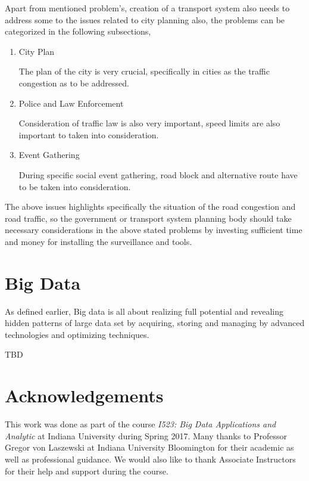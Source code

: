 \documentclass[sigconf]{acmart}
\begin{document}
Apart from mentioned problem's, creation of a transport system also needs to address some to the issues related to city planning also, the problems can be categorized in the following subsections,

\begin{enumerate}
\item City Plan 

The plan of the city is very crucial, specifically in cities as the traffic congestion as to be addressed. 

\item Police and Law Enforcement 

Consideration of traffic law is also very important, speed limits are also important to taken into consideration.

\item Event Gathering 

During specific social event gathering, road block and alternative route have to be taken into consideration.

\end{enumerate}

The above issues highlights specifically the situation of the road congestion and road traffic, so the government or transport system planning body should take necessary considerations in the above stated problems by investing sufficient time and money for installing the surveillance and tools. 


\section{Big Data}

As defined earlier, Big data is all about realizing full potential and revealing hidden patterns of large data set by acquiring, storing and managing by advanced technologies and optimizing techniques.


TBD \cite{wwwbigdata} 

\section*{Acknowledgements}

This work was done as part of the course {\em I523: Big Data Applications and Analytic} at Indiana University during Spring 2017. Many thanks to Professor Gregor von Laszewski at Indiana University Bloomington for their academic as well as professional guidance. We would also like to thank Associate Instructors for their help and support during the course. 



\end{document}
